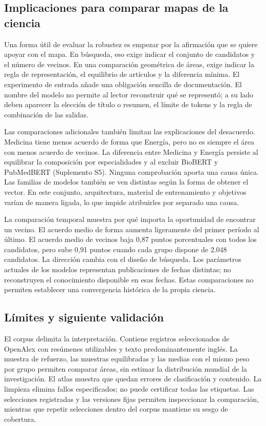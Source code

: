 \documentclass[12pt]{article}
\begin{document}
\subsection{Implicaciones para comparar mapas de la ciencia}
Una forma útil de evaluar la robustez es empezar por la afirmación que se quiere apoyar con el mapa. En búsqueda, eso exige indicar el conjunto de candidatos y el número de vecinos. En una comparación geométrica de áreas, exige indicar la regla de representación, el equilibrio de artículos y la diferencia mínima. El experimento de entrada añade una obligación sencilla de documentación. El nombre del modelo no permite al lector reconstruir qué se representó; a su lado deben aparecer la elección de título o resumen, el límite de tokens y la regla de combinación de las salidas.

Las comparaciones adicionales también limitan las explicaciones del desacuerdo. Medicina tiene menos acuerdo de forma que Energía, pero no es siempre el área con menos acuerdo de vecinos. La diferencia entre Medicina y Energía persiste al equilibrar la composición por especialidades y al excluir BioBERT y PubMedBERT (Suplemento S5). Ninguna comprobación aporta una causa única. Las familias de modelos también se ven distintas según la forma de obtener el vector. En este conjunto, arquitectura, material de entrenamiento y objetivos varían de manera ligada, lo que impide atribuirles por separado una causa.

La comparación temporal muestra por qué importa la oportunidad de encontrar un vecino. El acuerdo medio de forma aumenta ligeramente del primer período al último. El acuerdo medio de vecinos baja 0,87 puntos porcentuales con todos los candidatos, pero sube 0,91 puntos cuando cada grupo dispone de 2.048 candidatos. La dirección cambia con el diseño de búsqueda. Los parámetros actuales de los modelos representan publicaciones de fechas distintas; no reconstruyen el conocimiento disponible en esas fechas. Estas comparaciones no permiten establecer una convergencia histórica de la propia ciencia.

\subsection{Límites y siguiente validación}
El corpus delimita la interpretación. Contiene registros seleccionados de OpenAlex con resúmenes utilizables y texto predominantemente inglés. La muestra de refuerzo, las muestras equilibradas y las medias con el mismo peso por grupo permiten comparar áreas, sin estimar la distribución mundial de la investigación. El atlas muestra que quedan errores de clasificación y contenido. La limpieza elimina fallos especificados; no puede certificar todas las etiquetas. Las selecciones registradas y las versiones fijas permiten inspeccionar la comparación, mientras que repetir selecciones dentro del corpus mantiene su sesgo de cobertura.
\end{document}
